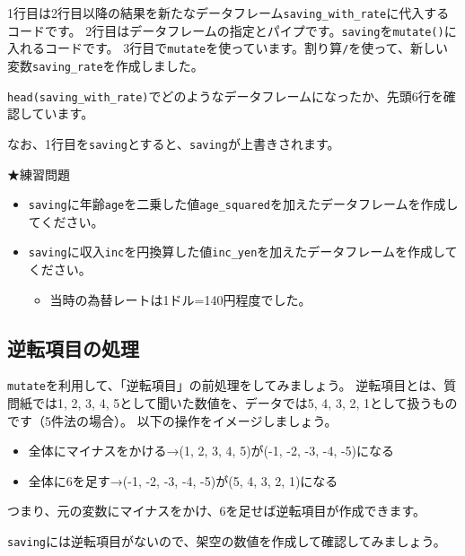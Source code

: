 \documentclass[
]{book}
\providecommand{\tightlist}{%
  \setlength{\itemsep}{0pt}\setlength{\parskip}{0pt}}
\begin{document}
1行目は2行目以降の結果を新たなデータフレーム\texttt{saving\_with\_rate}に代入するコードです。
2行目はデータフレームの指定とパイプです。\texttt{saving}を\texttt{mutate()}に入れるコードです。
3行目で\texttt{mutate}を使っています。割り算\texttt{/}を使って、新しい変数\texttt{saving\_rate}を作成しました。

\texttt{head(saving\_with\_rate)}でどのようなデータフレームになったか、先頭6行を確認しています。

なお、1行目を\texttt{saving}とすると、\texttt{saving}が上書きされます。

★練習問題

\begin{itemize}
\tightlist
\item
  \texttt{saving}に年齢\texttt{age}を二乗した値\texttt{age\_squared}を加えたデータフレームを作成してください。
\item
  \texttt{saving}に収入\texttt{inc}を円換算した値\texttt{inc\_yen}を加えたデータフレームを作成してください。

  \begin{itemize}
  \tightlist
  \item
    当時の為替レートは1ドル=140円程度でした。
  \end{itemize}
\end{itemize}

\hypertarget{ux9006ux8ee2ux9805ux76eeux306eux51e6ux7406}{%
\subsection{逆転項目の処理}\label{ux9006ux8ee2ux9805ux76eeux306eux51e6ux7406}}

\texttt{mutate}を利用して、「逆転項目」の前処理をしてみましょう。
逆転項目とは、質問紙では1, 2, 3, 4, 5として聞いた数値を、データでは5, 4, 3, 2, 1として扱うものです（5件法の場合）。
以下の操作をイメージしましょう。

\begin{itemize}
\tightlist
\item
  全体にマイナスをかける→(1, 2, 3, 4, 5)が(-1, -2, -3, -4, -5)になる
\item
  全体に6を足す→(-1, -2, -3, -4, -5)が(5, 4, 3, 2, 1)になる
\end{itemize}

つまり、元の変数にマイナスをかけ、6を足せば逆転項目が作成できます。

\texttt{saving}には逆転項目がないので、架空の数値を作成して確認してみましょう。
\end{document}
